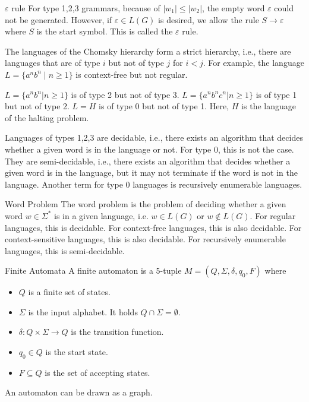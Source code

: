 \documentclass{beamer}
\begin{document}
\begin{frame}{$\varepsilon$ rule}
    For type 1,2,3 grammars, because of $|w_1|\leq |w_2|$, the empty word $\varepsilon$ could not be generated. However, if $\varepsilon\in L(G)$ is desired, we allow the rule $S\to\varepsilon$ where $S$ is the start symbol. This is called the $\varepsilon$ rule.
\end{frame}
\begin{frame}
The languages of the Chomsky hierarchy form a strict hierarchy, i.e., there are languages that are of type $i$ but not of type $j$ for $i<j$. For example, the language $L=\{a^nb^n\mid n\geq 1\}$ is context-free but not regular.
\begin{example}
    $L=\{a^nb^n|n\geq 1\}$ is of type 2 but not of type 3. $L=\{a^nb^nc^n|n\geq 1\}$ is of type 1 but not of type 2. $L=H$ is of type 0 but not of type 1. Here, $H$ is the language of the halting problem.
\end{example}
Languages of types 1,2,3 are decidable, i.e., there exists an algorithm that decides whether a given word is in the language or not. For type 0, this is not the case. They are semi-decidable, i.e., there exists an algorithm that decides whether a given word is in the language, but it may not terminate if the word is not in the language. Another term for type 0 languages is recursively enumerable languages.
\end{frame}

\begin{frame}{Word Problem}
    The word problem is the problem of deciding whether a given word $w\in\Sigma^*$ is in a given language, i.e. $w\in L(G)$ or $w\notin L(G)$. For regular languages, this is decidable. For context-free languages, this is also decidable. For context-sensitive languages, this is also decidable. For recursively enumerable languages, this is semi-decidable.
\end{frame}

\begin{frame}{Finite Automata}
    A finite automaton is a 5-tuple $M=(Q,\Sigma,\delta,q_0,F)$ where
    \begin{itemize}
        \item $Q$ is a finite set of states.
        \item $\Sigma$ is the input alphabet. It holds $Q\cap \Sigma=\emptyset$.
        \item $\delta:Q\times \Sigma\to Q$ is the transition function.
        \item $q_0\in Q$ is the start state.
        \item $F\subseteq Q$ is the set of accepting states.
    \end{itemize}
    An automaton can be drawn as a graph.

\end{frame}
\end{document}
